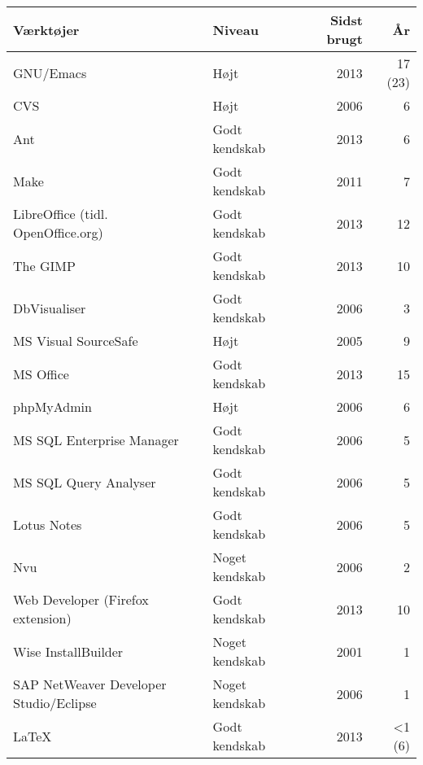 \documentclass[a4paper,11pt]{article}
\begin{document}
\bigskip
\begin{tabularx}{\textwidth}{X l r r}
  \textbf{Værktøjer}  & \textbf{Niveau}                     & \textbf{Sidst brugt}  & \textbf{År} \\
  \hline
  GNU/Emacs                               & Højt            & 2013                  & 17 (23)\\
  CVS                                     & Højt            & 2006                  &      6 \\
  Ant                                     & Godt kendskab   & 2013                  &      6 \\
  Make                                    & Godt kendskab   & 2011                  &      7 \\
  LibreOffice (tidl. OpenOffice.org)      & Godt kendskab   & 2013                  &     12 \\
  The GIMP                                & Godt kendskab   & 2013                  &     10 \\
  DbVisualiser                            & Godt kendskab   & 2006                  &      3 \\
  MS Visual SourceSafe                    & Højt            & 2005                  &      9 \\
  MS Office                               & Godt kendskab   & 2013                  &     15 \\
  phpMyAdmin                              & Højt            & 2006                  &      6 \\
  MS SQL Enterprise Manager               & Godt kendskab   & 2006                  &      5 \\
  MS SQL Query Analyser                   & Godt kendskab   & 2006                  &      5 \\
  Lotus Notes                             & Godt kendskab   & 2006                  &      5 \\
  Nvu                                     & Noget kendskab  & 2006                  &      2 \\
  Web Developer (Firefox extension)       & Godt kendskab   & 2013                  &     10 \\
  Wise InstallBuilder                     & Noget kendskab  & 2001                  &      1 \\
  SAP NetWeaver Developer Studio/Eclipse  & Noget kendskab  & 2006                  &      1 \\
  \LaTeX                                  & Godt kendskab   & 2013                  &  <1 (6)\\

\end{tabularx}
\end{document}
